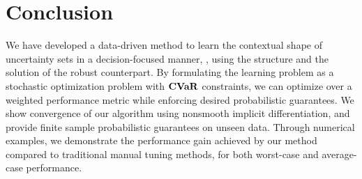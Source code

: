 \section{Conclusion}
We have developed a data-driven method to learn the contextual shape of uncertainty sets in a decision-focused manner, \ie, using the structure and the solution of the robust counterpart.
By formulating the learning problem as a stochastic optimization problem with $\mathop{\bf CVaR}$ constraints, we can optimize over a weighted performance metric while enforcing desired probabilistic guarantees. 
We show convergence of our algorithm using nonsmooth implicit differentiation, and provide finite sample probabilistic guarantees on unseen data.
Through numerical examples, we demonstrate the performance gain achieved by our method compared to traditional manual tuning methods, for both worst-case and average-case performance.
